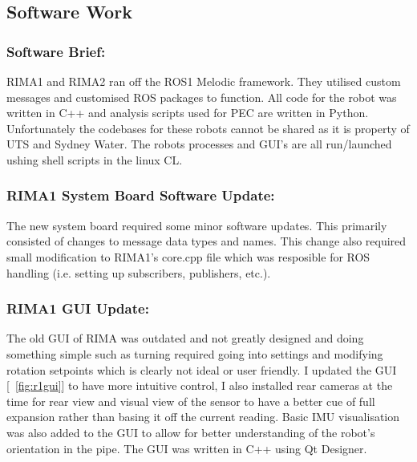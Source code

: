 \newpage
\subsection{Software Work}

\subsubsection{Software Brief: }
RIMA1 and RIMA2 ran off the ROS1 Melodic framework. They utilised custom messages and customised ROS packages to function. All code for the robot was written in C++ and analysis scripts used for PEC are written
in Python. Unfortunately the codebases for these robots cannot be shared as it is property of UTS and Sydney Water. The robots processes and GUI's are all run/launched ushing shell scripts in the linux CL.

\vspace{\baselineskip}
\subsubsection{RIMA1 System Board Software Update: }
The new system board required some minor software updates. This primarily consisted of changes to message data types and names. This change also required small modification to RIMA1's core.cpp file which was resposible 
for ROS handling (i.e. setting up subscribers, publishers, etc.). 

\vspace{\baselineskip}
\subsubsection{RIMA1 GUI Update: }
The old GUI of RIMA was outdated and not greatly designed and doing something simple such as turning required going into settings and modifying rotation setpoints which is clearly not ideal or user friendly. I updated
the GUI [~\ref{fig:r1gui}] to have more intuitive control, I also installed rear cameras at the time for rear view and visual view of the sensor to have a better cue of full expansion rather than basing it off the current reading. Basic 
IMU visualisation was also added to the GUI to allow for better understanding of the robot's orientation in the pipe. The GUI was written in C++ using Qt Designer.

